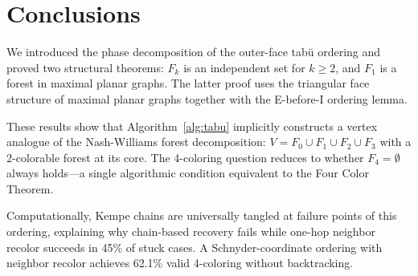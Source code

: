 \documentclass[11pt,twocolumn]{article}
\begin{document}
\section{Conclusions}

We introduced the phase decomposition of the outer-face tab\"{u} ordering and
proved two structural theorems: $F_k$ is an independent set for $k\geq 2$, and
$F_1$ is a forest in maximal planar graphs. The latter proof uses the triangular
face structure of maximal planar graphs together with the E-before-I ordering
lemma.

These results show that Algorithm~\ref{alg:tabu} implicitly constructs a vertex
analogue of the Nash-Williams forest decomposition: $V=F_0\cup F_1\cup F_2\cup
F_3$ with a 2-colorable forest at its core. The 4-coloring question reduces to
whether $F_4=\emptyset$ always holds---a single algorithmic condition equivalent
to the Four Color Theorem.

Computationally, Kempe chains are universally tangled at failure points of this
ordering, explaining why chain-based recovery fails while one-hop neighbor
recolor succeeds in 45\% of stuck cases. A Schnyder-coordinate ordering with
neighbor recolor achieves 62.1\% valid 4-coloring without backtracking.
\end{document}
